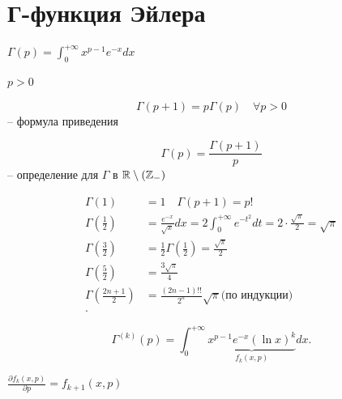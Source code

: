 \section{Г-функция Эйлера}

\begin{definition}
    $\Gamma(p) = \int_0^{+\infty }x^{p-1}e^{-x}dx$

    $p >0$
\end{definition}

\begin{property}
    \[\Gamma(p+1) = p\Gamma(p)\quad \forall p >0\] -- формула приведения

    \[\Gamma(p) = \frac{\Gamma(p+1)}{p}\] -- определение для $\Gamma$ в $\mathbb{R}\setminus \left( \mathbb{Z}_- \right) $

    \begin{align*}
    \Gamma(1) &= 1\quad \Gamma(p + 1) = p!\\
    \Gamma(\frac{1}{2}) &= \frac{e^{-x}}{\sqrt{x}}dx = 2\int_0^{+\infty }e^{-t^2}dt = 2 \cdot \frac{\sqrt{\pi}}{2} = \sqrt{\pi}\\
    \Gamma(\frac{3}{2}) &= \frac{1}{2} \Gamma(\frac{1}{2}) = \frac{\sqrt{\pi} }{2}\\
    \Gamma(\frac{5}{2}) &= \frac{3\sqrt{\pi} }{4}\\
    \Gamma(\frac{2n+1}{2}) &= \frac{(2n-1)!!}{2^n} \sqrt{\pi} \text{(по индукции)}\\
    .\end{align*}
\end{property}

\begin{note}
    \[
    \Gamma^{(k)}(p) = \int_0^{+\infty } \underbrace{x^{p-1}e^{-x} \left( \ln x \right) ^k}_{f_k(x, p)} dx
    .\]

    $\frac{\partial f_k(x, p)}{\partial p} = f_{k+1}(x, p)$
\end{note}

